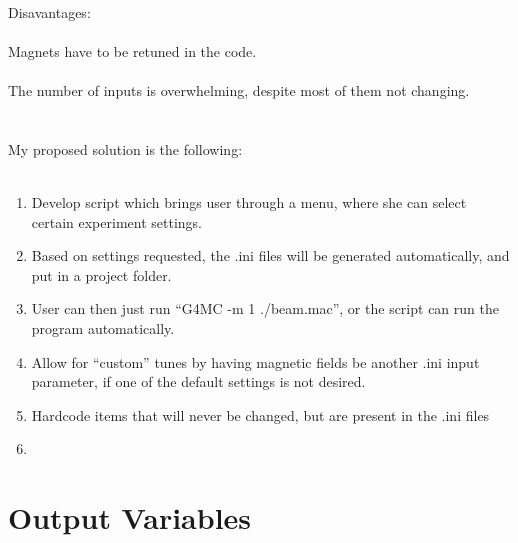 \documentclass[11pt]{amsart}
\begin{document}
\\
Disavantages:\\
\\
Magnets have to be retuned in the code.\\
\\
The number of inputs is overwhelming, despite most of them not changing.\\
\\
\\
My proposed solution is the following:\\
\\
\begin{enumerate}
  \item Develop script which brings user through a menu, where she can select certain experiment settings.
  \item Based on settings requested, the .ini files will be generated automatically, and put in a project folder.
  \item User can then just run ``G4MC -m 1 ./beam.mac'', or the script can run the program automatically.
  \item Allow for ``custom'' tunes by having magnetic fields be another .ini input parameter, if one of the default settings is not desired.
  \item Hardcode items that will never be changed, but are present in the .ini files
  \item 
\end{enumerate}

\section{Output Variables}
\end{document}
